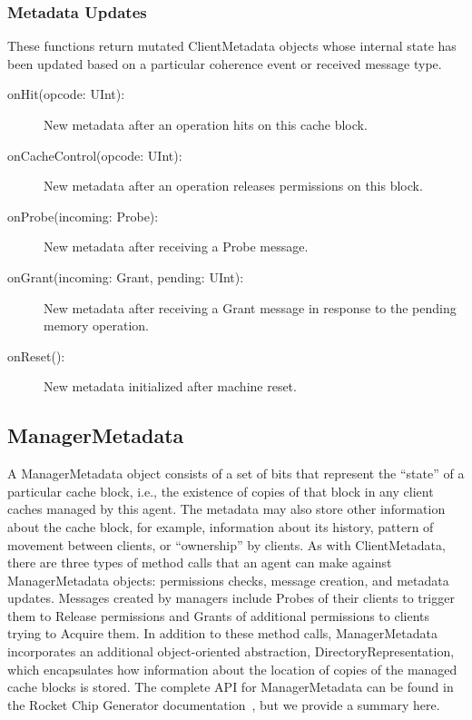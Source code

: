 \subsubsection{Metadata Updates}

These functions return mutated ClientMetadata objects whose internal state has been updated
based on a particular coherence event or received message type.

\begin{description}
\item[onHit(opcode: UInt):]
New metadata after an operation hits on this cache block.
\item[onCacheControl(opcode: UInt):]
New metadata after an operation releases permissions on this block.
\item[onProbe(incoming: Probe):]
New metadata after receiving a Probe message.
\item[onGrant(incoming: Grant, pending: UInt):]
New metadata after receiving a Grant message in response to the pending memory operation.
\item[onReset():]
New metadata initialized after machine reset.
\end{description}

\subsection{ManagerMetadata} 

A ManagerMetadata object consists of a set of bits that represent the ``state''
of a particular cache block,
i.e., the existence of copies of that block in any client caches
managed by this agent.
The metadata may also store other information about the cache block,
for example, information about its history, pattern of movement between clients,
or ``ownership'' by clients.
As with ClientMetadata, there are three types of method calls
that an agent can make against ManagerMetadata objects:
permissions checks, message creation, and metadata updates.
Messages created by managers include Probes of their clients to trigger them
to Release permissions and Grants of additional permissions to clients
trying to Acquire them.
In addition to these method calls, ManagerMetadata incorporates an additional
object-oriented abstraction, DirectoryRepresentation, which encapsulates
how information about the location of copies of the managed cache blocks is stored.
The complete API for ManagerMetadata can be found in the
Rocket Chip Generator documentation~\cite{rocket}, but we provide a summary here.

